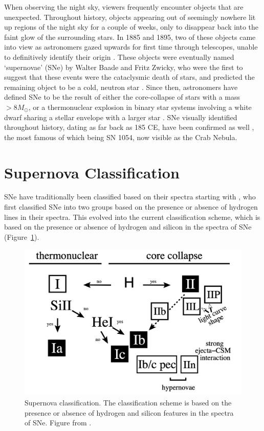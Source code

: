 When observing the night sky, viewers frequently encounter objects that 
are unexpected. Throughout history, objects appearing out of seemingly nowhere lit 
up regions of the night sky for a couple of weeks, only to disappear back 
into the faint glow of the surrounding stars. 
In 1885 and 1895, two of these objects came into view as astronomers gazed upwards 
for first time through telescopes, unable to definitively identify their 
origin \parencite{deVaucouleurs1985, Schaefer1995}.
These objects were eventually named `supernovae' (SNe) by Walter Baade and Fritz Zwicky, 
who were the first to suggest that these events were the cataclysmic death of stars, 
and predicted the remaining object to be a cold, 
neutron star \parencite{Baade1934}. Since then, astronomers 
have defined SNe to be the result of either the core-collapse of stars with a mass $>8M_\odot$, 
or a thermonuclear explosion in binary star systems involving a white dwarf sharing a stellar 
envelope with a larger star \parencite{Filippenko1997}. 
SNe visually identified throughout history, dating as far back as 185 CE, have been confirmed as well 
\parencite{Zhao_2006}, the most famous of which being SN 1054, now visible as the Crab Nebula. 

\section{Supernova Classification}
\label{sec:supernova-classification}
SNe have traditionally been classified based on their spectra starting with 
\textcite{Minkowski1941}, who first classified SNe into two groups based on the
presence or absence of hydrogen lines in their spectra. This evolved into 
the current classification scheme, which is based on the presence
or absence of hydrogen and silicon in the spectra of SNe (Figure~\ref{fig:sn-classification}). 

\begin{figure}[t]
    \centering
    \includegraphics[width=0.8\linewidth]{figures/supernova_class.png }
    \caption[Supernova Classification]{Supernova classification. The 
    classification scheme is based on the presence or absence of hydrogen and 
    silicon features in the spectra of SNe. Figure from \textcite{Turatto2003}.}
    \label{fig:sn-classification}
\end{figure}

